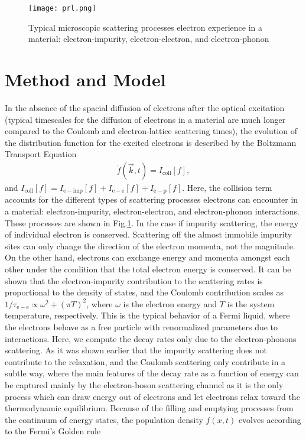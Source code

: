 \documentclass[aps,prl,twocolumn,showpacs,floatfix,superscriptaddress]{revtex4-1}
\begin{document}
\begin{figure}
        \texttt{[image: prl.png]}
        \caption{Typical microscopic scattering processes electron experience in a material: electron-impurity, electron-electron, and electron-phonon\cite{YangPRL}}
        \label{fig:prl}
\end{figure}

\section{Method and Model}

In the absence of the spacial diffusion of electrons after the optical excitation (typical timescales for the diffusion of electrons in a material are much longer compared to the Coulomb and electron-lattice scattering times), the evolution of the distribution function for the excited electrons is described by the Boltzmann Transport Equation\cite{Ziman}
\begin{align}
\dot{f}(\vec{k},t) = I_\mathrm{coll}[f],
\end{align}
and $I_\mathrm{coll}[f] = I_\mathrm{e-imp}[f] + I_\mathrm{e-e}[f] + I_\mathrm{e-p}[f]$. 
Here, the collision term accounts for the different types of scattering processes electrons can encounter in a material: electron-impurity, electron-electron, and electron-phonon interactions. These processes are shown in Fig.\ref{fig:prl}. In the case if impurity scattering, the energy of individual electron is conserved. Scattering off the almost immobile impurity sites can only change the direction of the electron momenta, not the magnitude. On the other hand, electrons can exchange energy and momenta amongst each other under the condition that the total electron energy is conserved. It can be shown that the electron-impurity contribution to the scattering rates is proportional to the density of states, and the Coulomb contribution scales as $1/\tau_\mathrm{e-e}\propto \omega^2 + (\pi T)^2$, where $\omega$ is the electron energy and $T$ is the system temperature, respectively\cite{KemperPRX}. This is the typical behavior of a Fermi liquid, where the electrons behave as a free particle with renormalized parameters due to interactions. Here, we compute the decay rates only due to the electron-phonons scattering. As it was shown earlier that the impurity scattering does not contribute to the relaxation, and the Coulomb scattering only contribute in a subtle way, where the main features of the decay rate as a function of energy can be captured mainly by the electron-boson scattering channel as it is the only process which can draw energy out of electrons and let electrons relax toward the thermodynamic equilibrium\cite{KemperPRX}. Because of the filling and emptying processes from the continuum of energy states, the population density $f(x,t)$ evolves according to the Fermi's Golden rule
\end{document}
